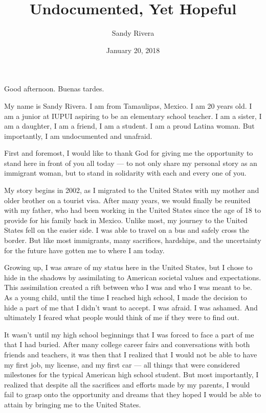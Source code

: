 \documentclass[10pt,a4paper]{article}
\begin{document}
\title{Undocumented, Yet Hopeful}
\date{January 20, 2018}
\author{Sandy Rivera}

\maketitle

\noindent\linenumbers Good afternoon. Buenas tardes.

My name is Sandy Rivera. I am from Tamaulipas, Mexico. I am 20 years old. I am a junior at IUPUI aspiring to be an elementary school teacher. I am a sister, I am a daughter, I am a friend, I am a student. I am a proud Latina woman. But importantly, I am undocumented and unafraid.

First and foremost, I would like to thank God for giving me the opportunity to stand here in front of you all today — to not only share my personal story as an immigrant woman, but to stand in solidarity with each and every one of you.

My story begins in 2002, as I migrated to the United States with my mother and older brother on a tourist visa. After many years, we would finally be reunited with my father, who had been working in the United States since the age of 18 to provide for his family back in Mexico. Unlike most, my journey to the United States fell on the easier side. I was able to travel on a bus and safely cross the border. But like most immigrants, many sacrifices, hardships, and the uncertainty for the future have gotten me to where I am today.

Growing up, I was aware of my status here in the United States, but I chose to hide in the shadows by assimilating to American societal values and expectations. This assimilation created a rift between who I was and who I was meant to be. As a young child, until the time I reached high school, I made the decision to hide a part of me that I didn't want to accept. I was afraid. I was ashamed. And ultimately I feared what people would think of me if they were to find out.

It wasn't until my high school beginnings that I was forced to face a part of me that I had buried. After many college career fairs and conversations with both friends and teachers, it was then that I realized that I would not be able to have my first job, my license, and my first car — all things that were considered milestones for the typical American high school student. But most importantly, I realized that despite all the sacrifices and efforts made by my parents, I would fail to grasp onto the opportunity and dreams that they hoped I would be able to attain by bringing me to the United States.
\end{document}
